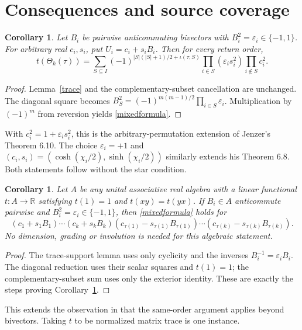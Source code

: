 \documentclass[11pt]{article}
\newtheorem{corollary}[theorem]{Corollary}
\newcommand{\inv}{\iota}
\begin{document}
\section{Consequences and source coverage}
\begin{corollary}\label{mixed}
Let $B_i$ be pairwise anticommuting bivectors with
$B_i^2=\varepsilon_i\in\{-1,1\}$. For arbitrary real $c_i,s_i$, put
$U_i=c_i+s_iB_i$. Then for every return order,
\begin{equation}\label{mixedformula}
t(\Theta_k(\tau))=
\sum_{S\subseteq I}(-1)^{|S|(|S|+1)/2+\inv(\tau,S)}
\prod_{i\in S}(\varepsilon_i s_i^2)\prod_{i\notin S}c_i^2.
\end{equation}
\end{corollary}
\begin{proof}
Lemma~\ref{trace} and the complementary-subset cancellation are unchanged.
The diagonal square becomes
$B_S^2=(-1)^{m(m-1)/2}\prod_{i\in S}\varepsilon_i$.
Multiplication by $(-1)^m$ from reversion yields \eqref{mixedformula}.
\end{proof}
With $c_i^2=1+\varepsilon_i s_i^2$, this is the arbitrary-permutation
extension of Jenzer's Theorem 6.10. The choice $\varepsilon_i=+1$ and
$(c_i,s_i)=(\cosh(\chi_i/2),\sinh(\chi_i/2))$ similarly extends his
Theorem 6.8. Both statements follow without the star condition.

\begin{corollary}\label{tracial}
Let $A$ be any unital associative real algebra with a linear functional
$t:A\to\mathbb R$ satisfying $t(1)=1$ and $t(xy)=t(yx)$.
If $B_i\in A$ anticommute pairwise and $B_i^2=\varepsilon_i\in\{-1,1\}$,
then \eqref{mixedformula} holds for
\[
(c_1+s_1B_1)\cdots(c_k+s_kB_k)
(c_{\tau(1)}-s_{\tau(1)}B_{\tau(1)})\cdots
(c_{\tau(k)}-s_{\tau(k)}B_{\tau(k)}).
\]
No dimension, grading or involution is needed for this algebraic statement.
\end{corollary}
\begin{proof}
The trace-support lemma uses only cyclicity and the inverses
$B_i^{-1}=\varepsilon_iB_i$. The diagonal reduction uses their scalar
squares and $t(1)=1$; the complementary-subset sum uses only the exterior
identity. These are exactly the steps proving Corollary~\ref{mixed}.
\end{proof}
This extends the observation in \cite[Remark 5.2, p.~17]{Jenzer} that
the same-order argument applies beyond bivectors. Taking $t$ to be
normalized matrix trace is one instance.
\end{document}

